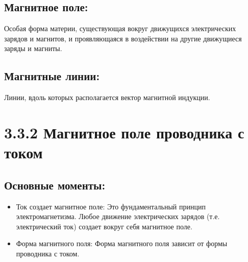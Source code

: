 \documentclass[a4paper,12pt]{article}
\begin{document}
\vspace{-9pt}
\subsection*{Магнитное поле:}
\vspace{-3pt}
Особая форма материи, существующая вокруг движущихся электрических зарядов и магнитов, и проявляющаяся в воздействии на другие движущиеся заряды и магниты.

\vspace{-9pt}
\subsection*{Магнитные линии:}
\vspace{-3pt}
Линии, вдоль которых располагается вектор магнитной индукции.

\section*{3.3.2 Магнитное поле проводника с током}
\vspace{-9pt}
\subsection*{Основные моменты:}
\vspace{-3pt}
\begin{itemize}
    \item Ток создает магнитное поле: Это фундаментальный принцип электромагнетизма. Любое движение электрических зарядов (т.е. электрический ток) создает вокруг себя магнитное поле.
    \item Форма магнитного поля: Форма магнитного поля зависит от формы проводника с током.
\end{itemize}

\vspace{-9pt}
\end{document}
